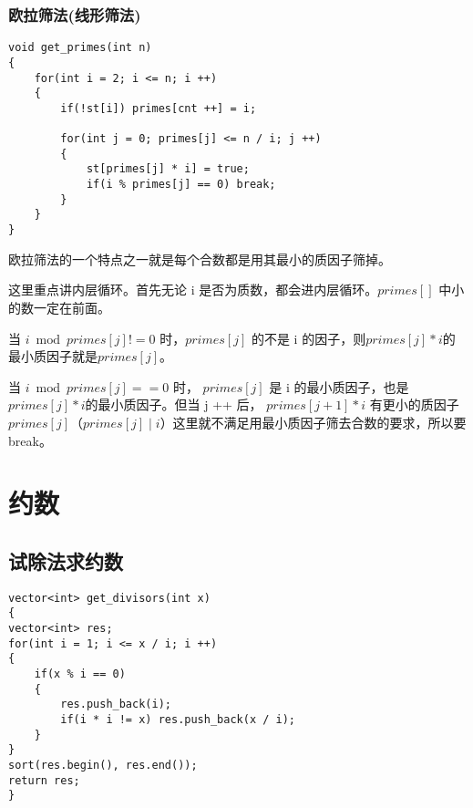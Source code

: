 \documentclass[]{book}
\begin{document}
\subsection{欧拉筛法(线形筛法)}
\begin{lstlisting}
void get_primes(int n)
{
    for(int i = 2; i <= n; i ++)
    {
        if(!st[i]) primes[cnt ++] = i;
        
        for(int j = 0; primes[j] <= n / i; j ++)
        {
            st[primes[j] * i] = true;
            if(i % primes[j] == 0) break;
        }
    }
}
\end{lstlisting}

欧拉筛法的一个特点之一就是每个合数都是用其最小的质因子筛掉。

这里重点讲内层循环。首先无论 i 是否为质数，都会进内层循环。$primes[]$ 中小的数一定在前面。

当 $i \bmod primes[j] != 0$ 时，$primes[j]$ 的不是 i 的因子，则$primes[j] * i$的最小质因子就是$primes[j]$。

当 $i \bmod primes[j] == 0$ 时， $primes[j]$ 是 i 的最小质因子，也是$primes[j] * i$的最小质因子。但当 j ++ 后，
$primes[j + 1] * i$ 有更小的质因子 $primes[j]$（$primes[j] \mid i$）这里就不满足用最小质因子筛去合数的要求，所以要break。

\chapter{约数}
\section{试除法求约数}
\begin{lstlisting}
vector<int> get_divisors(int x)
{
vector<int> res;
for(int i = 1; i <= x / i; i ++)
{
    if(x % i == 0)
    {
        res.push_back(i);
        if(i * i != x) res.push_back(x / i);
    }
}
sort(res.begin(), res.end());
return res;
}
\end{lstlisting}
\end{document}
